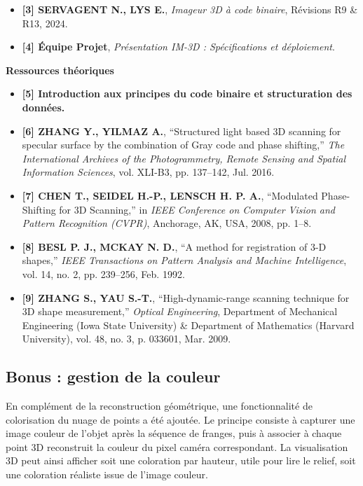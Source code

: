\documentclass[10pt]{article} %
\begin{document}
\begin{itemize}
    \item \textbf{[3] SERVAGENT N., LYS E.}, \textit{Imageur 3D à code binaire}, Révisions R9 \& R13, 2024.
    \item \textbf{[4] Équipe Projet}, \textit{Présentation IM-3D : Spécifications et déploiement}.
\end{itemize}
\textbf{Ressources théoriques}

\begin{itemize}
    \item \textbf{[5] Introduction aux principes du code binaire et structuration des données.}
    \item \textbf{[6] ZHANG Y., YILMAZ A.}, ``Structured light based 3D scanning for specular surface by the combination of Gray code and phase shifting,'' \textit{The International Archives of the Photogrammetry, Remote Sensing and Spatial Information Sciences}, vol. XLI-B3, pp. 137--142, Jul. 2016.
    \item \textbf{[7] CHEN T., SEIDEL H.-P., LENSCH H. P. A.}, ``Modulated Phase-Shifting for 3D Scanning,'' in \textit{IEEE Conference on Computer Vision and Pattern Recognition (CVPR)}, Anchorage, AK, USA, 2008, pp. 1--8.
    \item \textbf{[8] BESL P. J., MCKAY N. D.}, ``A method for registration of 3-D shapes,'' \textit{IEEE Transactions on Pattern Analysis and Machine Intelligence}, vol. 14, no. 2, pp. 239--256, Feb. 1992.
    \item \textbf{[9] ZHANG S., YAU S.-T.}, ``High-dynamic-range scanning technique for 3D shape measurement,'' \textit{Optical Engineering}, Department of Mechanical Engineering (Iowa State University) \& Department of Mathematics (Harvard University), vol. 48, no. 3, p. 033601, Mar. 2009.
\end{itemize}

\subsection{Bonus : gestion de la couleur}

En complément de la reconstruction géométrique, une fonctionnalité de colorisation du nuage de points a été ajoutée. Le principe consiste à capturer une image couleur de l'objet après la séquence de franges, puis à associer à chaque point 3D reconstruit la couleur du pixel caméra correspondant. La visualisation 3D peut ainsi afficher soit une coloration par hauteur, utile pour lire le relief, soit une coloration réaliste issue de l'image couleur.
\end{document}
